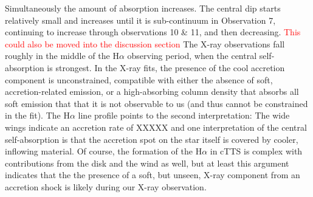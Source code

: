 \documentclass[twocolumn]{aastex631}
\newcommand\halpha{\ensuremath{{\text{H}\alpha}}}
\newcommand{\red}[1]{\textcolor{red}{#1}}
\begin{document}
Simultaneously the amount of absorption increases. The central dip starts relatively small and increases until it is sub-continuum in Observation 7, continuing to increase through observations 10 \& 11, and then decreasing. \red{This could also be moved into the discussion section} The X-ray observations fall roughly in the middle of the \halpha{} observing period, when the central self-absorption is strongest. In the X-ray fits, the presence of the cool accretion component is unconstrained, compatible with either the absence of soft, accretion-related emission, or a high-absorbing column density that absorbs all soft emission that that it is not observable to us (and thus cannot be constrained in the fit). The \halpha{} line profile points to the second interpretation: The wide wings indicate an accretion rate of XXXXX and one interpretation of the central self-absorption is that the accretion spot on the star itself is covered by cooler, inflowing material. Of course, the formation of the \halpha{} in cTTS is complex with contributions from the disk and the wind as well, but at least this argument indicates that the the presence of a soft, but unseen, X-ray component from an accretion shock is likely during our X-ray observation.  
\end{document}

